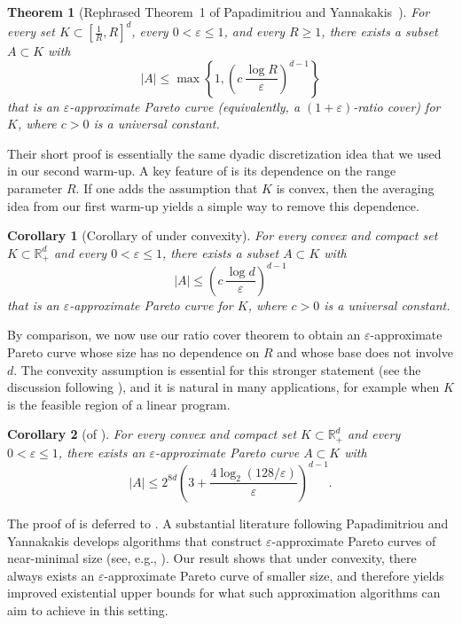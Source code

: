 \documentclass[11pt]{article}
\newcommand{\R}{\mathbb R}
\renewcommand{\le}{\leqslant}
\renewcommand{\ge}{\geqslant}
\newcommand{\eps}{\varepsilon}
\newtheorem{theorem}{Theorem}
\newtheorem{corollary}{Corollary}
\theoremstyle{definition}
\theoremstyle{remark}
\begin{document}
\begin{theorem}[Rephrased Theorem~1 of Papadimitriou and Yannakakis~\cite{papadimitriou2000approximability}]
\label{thm:py20}
For every set $K \subset [\frac{1}{R},R]^d$, every $0 < \eps \le 1$, and every $R \ge 1$, there exists a subset $A\subset K$ with
\[
|A| \le \max\left\{1, \left(c\,\frac{\log R}{\eps}\right)^{d-1}\right\}
\]
that is an $\eps$-approximate Pareto curve (equivalently, a $(1+\eps)$-ratio cover) for $K$, where $c>0$ is a universal constant.
\end{theorem}

Their short proof is essentially the same dyadic discretization idea that we used in our second warm-up.
A key feature of  is its dependence on the range parameter $R$.
If one adds the assumption that $K$ is convex, then the averaging idea from our first warm-up yields a simple way to remove this dependence.

\begin{corollary}[Corollary of  under convexity]\label{cor:py-convex}
For every convex and compact set $K \subset \R_+^d$ and every $0 < \eps \le 1$, there exists a subset $A\subset K$ with
\[
|A| \le \left(c\,\frac{\log d}{\eps}\right)^{d-1}
\]
that is an $\eps$-approximate Pareto curve for $K$, where $c>0$ is a universal constant.
\end{corollary}

By comparison, we now use our ratio cover theorem to obtain an $\eps$-approximate Pareto curve whose size has no dependence on $R$ and whose base does not involve $d$.
The convexity assumption is essential for this stronger statement (see the discussion following ), and it is natural in many applications, for example when $K$ is the feasible region of a linear program.

\begin{corollary}[of ]
  \label{cor:eps-pareto}
  For every convex and compact set $K \subset \R_+^d$ and every $0 < \eps \le 1$, there exists an $\eps$-approximate Pareto curve $A \subset K$ with
  \[
  |A| \le 2^{8d}\left(3 + \frac{4\log_2(128/\eps)}{\eps}\right)^{d-1}.
  \]
\end{corollary}

The proof of  is deferred to .
A substantial literature following Papadimitriou and Yannakakis develops algorithms that construct $\eps$-approximate Pareto curves of near-minimal size (see, e.g., \cite{vassilvitskii2005efficiently,diakonikolas2008succinct,diakonikolas2010small,bazgan2015approximate,daskalakis2016good}).
Our result shows that under convexity, there always exists an $\eps$-approximate Pareto curve of smaller size, and therefore yields improved existential upper bounds for what such approximation algorithms can aim to achieve in this setting.
\end{document}
